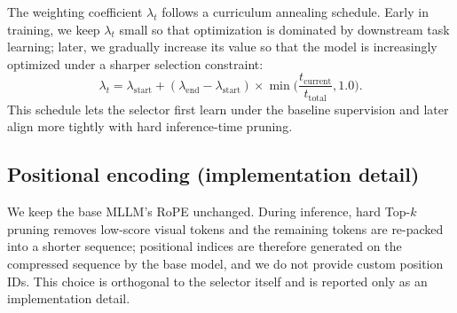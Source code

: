 The weighting coefficient $\lambda_t$ follows a curriculum annealing schedule.
Early in training, we keep $\lambda_t$ small so that optimization is dominated by downstream task learning; later, we gradually increase its value so that the model is increasingly optimized under a sharper selection constraint:
\begin{equation}
\lambda_t = \lambda_{\mathrm{start}} + (\lambda_{\mathrm{end}}-\lambda_{\mathrm{start}})\times \min\Big(\frac{t_{\mathrm{current}}}{t_{\mathrm{total}}},1.0\Big).
\label{eq:method_cas_schedule}
\end{equation}
This schedule lets the selector first learn under the baseline supervision and later align more tightly with hard inference-time pruning.

\subsection{Positional encoding (implementation detail)}
\label{sec:method_rope}
We keep the base MLLM's RoPE unchanged.
During inference, hard Top-$k$ pruning removes low-score visual tokens and the remaining tokens are re-packed into a shorter sequence; positional indices are therefore generated on the compressed sequence by the base model, and we do not provide custom position IDs.
This choice is orthogonal to the selector itself and is reported only as an implementation detail.
